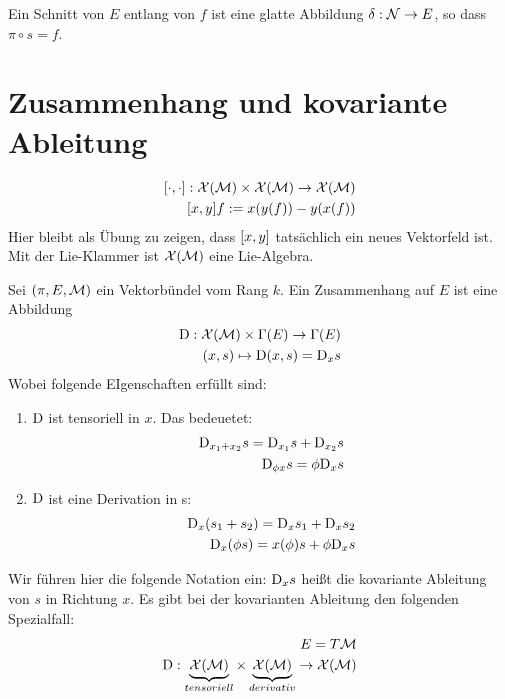 \begin{defs}
Ein Schnitt von $E$ entlang von $f$ ist eine glatte Abbildung $\delta : \mathcal{N} \to E$, so dass $\pi \circ s = f$. 
\end{defs}

\section{Zusammenhang und kovariante Ableitung}

\begin{defs}
\begin{align}
\comm{\cdot}{\cdot} : \mathcal{X}(\mfk) \times \mathcal{X}(\mfk) \to \mathcal{X}(\mfk)\\
\comm{x}{y} f := x(y(f)) - y(x(f))
\end{align}
Hier bleibt als Übung zu zeigen, dass $\comm{x}{y}$ tatsächlich ein neues Vektorfeld ist.
Mit der Lie-Klammer ist $\mathcal{X}(\mathcal{M})$ eine Lie-Algebra.
\end{defs}

\begin{defs}[Zusammenhang]
Sei $(\pi, E, \mathcal{M})$ ein Vektorbündel vom Rang $k$.
Ein Zusammenhang auf $E$ ist eine Abbildung
\begin{align}
\mathrm{D} : \mathcal{X}(\mathcal{M}) \times \Gamma(E) \to \Gamma (E) \\
(x, s) \mapsto \mathrm{D} (x, s) = \mathrm{D}_x s
\end{align}
Wobei folgende EIgenschaften erfüllt sind:
\begin{enumerate}
\item $\mathrm{D}$ ist tensoriell in $x$. 
Das bedeuetet:
\begin{align}
\mathrm{D}_{x_1 + x_2} s = \mathrm{D}_{x_1} s + \mathrm{D}_{x_2} s \\
\mathrm{D}_{\phi x} s = \phi \mathrm{D}_x s
\end{align}
\item $\mathrm{D}$ ist eine Derivation in s:
\begin{align}
\mathrm{D}_x (s_1 + s_2) = \mathrm{D}_x s_1 + \mathrm{D}_x s_2\\
\mathrm{D}_x (\phi s) = x(\phi) s + \phi \mathrm{D}_x  s
\end{align}
\end{enumerate}
\end{defs}

Wir führen hier die folgende Notation ein:
$\mathrm{D}_x s$ heißt die kovariante Ableitung von $s$ in Richtung $x$.
Es gibt bei der kovarianten Ableitung den folgenden Spezialfall:
\begin{align}
E = T\mathcal{M}\\
\mathrm{D}: \underbrace{\mathcal{X}(\mathcal{M})}_{tensoriell} \times \underbrace{\mathcal{X}(\mathcal{M})}_{derivativ} \to \mathcal{X}(\mathcal{M})
\end{align}

